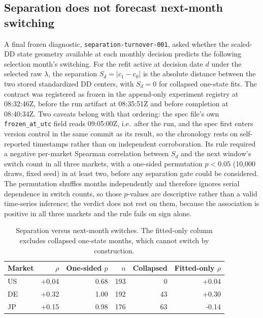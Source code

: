 \documentclass[11pt]{article}
\begin{document}
\subsection{Separation does not forecast next-month switching}

A final frozen diagnostic, \texttt{separation-turnover-001}, asked whether the
scaled-DD state geometry available at each monthly decision predicts the
following selection month's switching. For the refit active at decision date
\(d\) under the selected raw \(\lambda\), the separation
\(S_d=\lvert c_1-c_0\rvert\) is the absolute distance between the two stored
standardized DD centers, with \(S_d=0\) for collapsed one-state fits. The
contract was registered as frozen in the append-only experiment registry at
08:32:46Z, before the run artifact at 08:35:51Z and before completion at
08:40:34Z. Two caveats belong with that ordering: the spec file's own
\texttt{frozen\_at\_utc} field reads 09:05:00Z, i.e.\ after the run, and the
spec first enters version control in the same commit as its result, so the
chronology rests on self-reported timestamps rather than on independent
corroboration. Its rule required a negative per-market Spearman correlation
between \(S_d\) and the next window's switch count in all three markets, with a
one-sided permutation \(p<0.05\) (10{,}000 draws, fixed seed) in at least two,
before any separation gate could be considered. The permutation shuffles months
independently and therefore ignores serial dependence in switch counts, so those
\(p\)-values are descriptive rather than a valid time-series inference; the
verdict does not rest on them, because the association is positive in all three
markets and the rule fails on sign alone.

\begin{table}[!htbp]
\centering
\caption{Separation versus next-month switches. The fitted-only column
excludes collapsed one-state months, which cannot switch by construction.}
\label{tab:separation}
\small
\begin{tabular}{lrrrrr}
\toprule
Market & \(\rho\) & One-sided \(p\) & \(n\) & Collapsed & Fitted-only \(\rho\) \\
\midrule
US & +0.04 & 0.68 & 193 & 0  & +0.04 \\
DE & +0.32 & 1.00 & 192 & 43 & +0.30 \\
JP & +0.15 & 0.98 & 176 & 63 & -0.14 \\
\bottomrule
\end{tabular}
\end{table}
\end{document}
